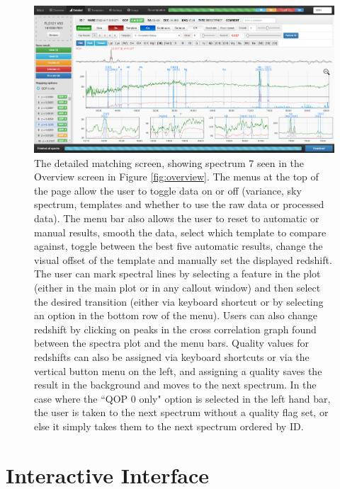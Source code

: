 \documentclass[iop]{emulateapj}
\newcommand{\tam}{\color{blue}}
\begin{document}
\begin{figure}[H]
\centering
\includegraphics[width=\textwidth]{InterfaceZ2.png}
\caption{The detailed matching screen, showing spectrum 7 seen in the Overview screen in Figure \ref{fig:overview}. The menus at the top of the page allow the user to toggle data on or off (variance, sky spectrum, templates and whether to use the raw data or processed data). The menu bar also allows the user to reset to automatic or manual results, smooth the data, select which template to compare against, toggle between the best five automatic results, change the visual offset of the template and manually set the displayed redshift. The user can mark spectral lines by selecting a feature in the plot (either in the main plot or in any callout window) and then select the desired transition (either via keyboard shortcut or by selecting an option in the bottom row of the menu). Users can also change redshift by clicking on peaks in the cross correlation graph found between the spectra plot and the menu bars. Quality values for redshifts can also be assigned via keyboard shortcuts or via the vertical button menu on the left, and assigning a quality saves the result in the background and moves to the next spectrum. In the case where the ``QOP 0 only" option is selected in the left hand bar, the user is taken to the next {\tam spectrum} without a quality flag set, or else it simply takes them to the next {\tam spectrum} ordered by ID.}
\label{fig:detailed}
\end{figure}







\section{{\tam Interactive} Interface}
\end{document}
